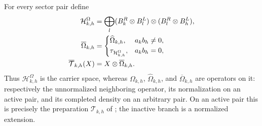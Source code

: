 \begin{definition}
    \label{def:mpdo_completed_omega_preparation}
    \leanok
    For every sector pair define
    \begin{align}
        \mathcal H^{\Omega}_{k,h}
         & =
        \bigoplus_l
        (B_k^R\otimes B_l^L)\otimes(B_l^R\otimes B_h^L), \notag      \\
        \overline\Omega_{k,h}
         & =
        \begin{cases}
            \widehat\Omega_{k,h},             & a_kb_h\ne0, \\
            \tau_{\mathcal H^{\Omega}_{k,h}}, & a_kb_h=0,
        \end{cases} \notag \\
        \overline{\mathcal T}_{k,h}(X)
         & =X\otimes\overline\Omega_{k,h}. \notag
    \end{align}
    Thus $\mathcal H^{\Omega}_{k,h}$ is the carrier space, whereas
    $\Omega_{k,h}$, $\widehat\Omega_{k,h}$, and
    $\overline\Omega_{k,h}$ are operators on it: respectively the
    unnormalized neighboring operator, its normalization on an active pair,
    and its completed density on an arbitrary pair. On an active pair this is
    precisely the preparation
    $\mathcal T_{k,h}$ of
    \cite[Appendix~C.2, lines~1527--1535]{Cirac2016MPDO_arXiv}; the inactive
    branch is a normalized extension.
\end{definition}

